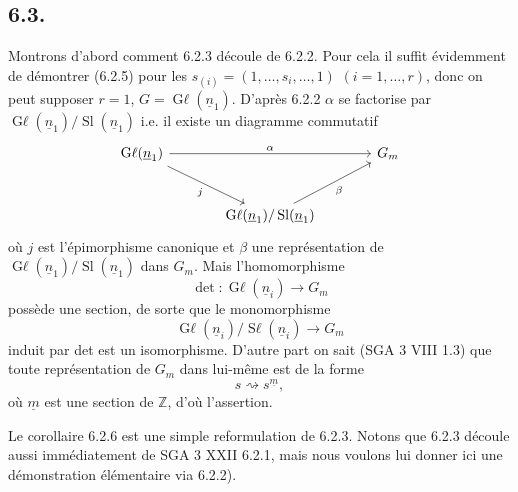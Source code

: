 
\subsection*{6.3.}
Montrons d'abord comment 6.2.3 découle de 6.2.2. Pour cela il suffit évidemment de démontrer (6.2.5) pour les
\(s_{(i)}=(1,\ldots,s_i,\ldots,1)\) \((i=1,\ldots,r)\), donc on peut supposer \(r=1\), \(G=\operatorname{G\ell}(\underline{n}_1)\). D'après 6.2.2 \(\alpha\) se factorise par \(\operatorname{G\ell}(\underline{n}_1)/\operatorname{Sl}(\underline{n}_1)\) i.e. il existe un diagramme commutatif
\[
\begin{tikzcd}[column sep=large,row sep=large]
\operatorname{G\ell}(\underline{n}_1) \arrow[rr,"\alpha"] \arrow[dr,"j"'] && {G}_m\\
& \operatorname{G\ell}(\underline{n}_1)/\operatorname{Sl}(\underline{n}_1) \arrow[ur,"\beta"'] &
\end{tikzcd}
\]
où \(j\) est l'épimorphisme canonique et \(\beta\) une représentation de \(\operatorname{G\ell}(\underline{n}_1)/\operatorname{Sl}(\underline{n}_1)\) dans \({G}_m\). Mais l'homomorphisme
\[
 \det:\operatorname{G\ell}(\underline{n}_i)\longrightarrow{G}_m
\]
possède une section, de sorte que le monomorphisme
\[
 \operatorname{G\ell}(\underline{n}_i)/\operatorname{S\ell}(\underline{n}_i)\longrightarrow{G}_m
\]
induit par det est un isomorphisme. D'autre part on sait (SGA 3 VIII 1.3) que toute représentation de \({G}_m\) dans lui-même est de la forme
\[
 s\rightsquigarrow s^{\underline{m}},
\]
où \(\underline{m}\) est une section de \(\mathbb Z\), d'où l'assertion.

Le corollaire 6.2.6 est une simple reformulation de 6.2.3. Notons que 6.2.3 découle aussi immédiatement de SGA 3 XXII 6.2.1, mais nous voulons lui donner ici une démonstration élémentaire via 6.2.2).

